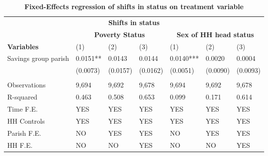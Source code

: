 \begin{table}[!h]
\centering
\begin{tabular}{lllllll}
\hline 
 \multicolumn{7}{c}{\bfseries  Shifts in status} \\
& \multicolumn{3}{c}{\bfseries  Poverty Status} &  \multicolumn{3}{c}{\bfseries  Sex of HH head status} \\
\cline{1-7}
 {\bfseries Variables} & (1) & (2) & (3) & (1) & (2) & (3)
 &  \\
 \hline
Savings group parish & 0.0151** & 0.0143 & 0.0144 & 0.0140*** & 0.0020  & 0.0004 \\
 & (0.0073)	& (0.0157)	& (0.0162)	& (0.0051)	& (0.0090)	& (0.0093)
 \\
 &  \\
Observations & 9,694 &	9,692 &	9,678	& 9,694 & 	9,692 &	9,678
\\
R-squared & 0.463 &	0.508 &	0.653	& 0.099 &	0.171	& 0.614
 \\
Time F.E. & YES & YES & YES & YES & YES & YES \\
HH Controls & YES & YES & YES & YES & YES & YES \\
Parish F.E. & NO & YES & YES & NO & YES & YES  \\
HH F.E. & NO & NO & YES & NO & NO & YES \\ \hline
\cline{1-7}
\end{tabular}
\caption{\bfseries Fixed-Effects regression of shifts in status on treatment variable}
\end{table}
\pagebreak




